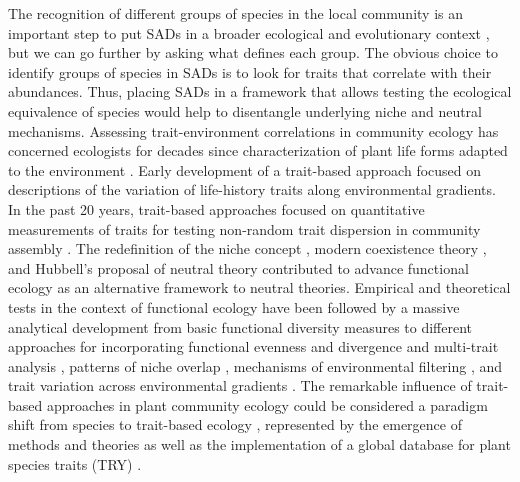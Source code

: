 \documentclass[12pt]{article}
\begin{document}
The recognition of different groups of species in the local community is an important step to put SADs in a broader ecological and evolutionary context \citep{McGill2007, Swenson2012}, but we can go further by asking what defines each group. The obvious choice to identify groups of species in SADs is to look for traits that correlate with their abundances.  Thus, placing SADs in a framework that allows testing the ecological equivalence of species would help to disentangle underlying niche and neutral mechanisms. Assessing trait-environment correlations in community ecology has concerned ecologists for decades since \cite{Raunkiaer1934} characterization of plant life forms adapted to the environment \citep[see also][]{Grime1977, Connell1978}. Early development of a trait-based approach focused on descriptions of the variation of life-history traits along environmental gradients. In the past 20 years, trait-based approaches focused on quantitative measurements of traits for testing non-random trait dispersion in community assembly
\citep{Swenson2012}. The redefinition of the niche concept \citep{Chase2003},
modern coexistence theory \citep{Chesson2000}, and Hubbell's proposal of neutral theory \citep{Hubbell2001} contributed to
advance functional ecology as an alternative framework to neutral theories. 
Empirical and theoretical tests in the context of functional ecology have been followed by a massive analytical development \citep{Kraft2010} from basic functional diversity measures
\citep{Petchey2002a, Petchey2007} to different approaches for incorporating functional evenness and divergence \citep{Mason2005, Pavoine2009} and multi-trait analysis \citep{Laliberte2010}, patterns of niche overlap \citep{Mason2008}, mechanisms of environmental filtering \citep{Kraft2007, Mayfield2009}, and trait
variation across environmental gradients \citep{shipley2006plant, cornwell2009community, messier2010traits}. 
The remarkable influence of trait-based approaches in plant community ecology could be considered a paradigm shift from species to trait-based ecology \citep{Pavoine2011, Swenson2012}, represented by the emergence of methods and theories as well as the implementation of a global database for plant species traits (TRY) \citep{Kattage2011}.
\end{document}
